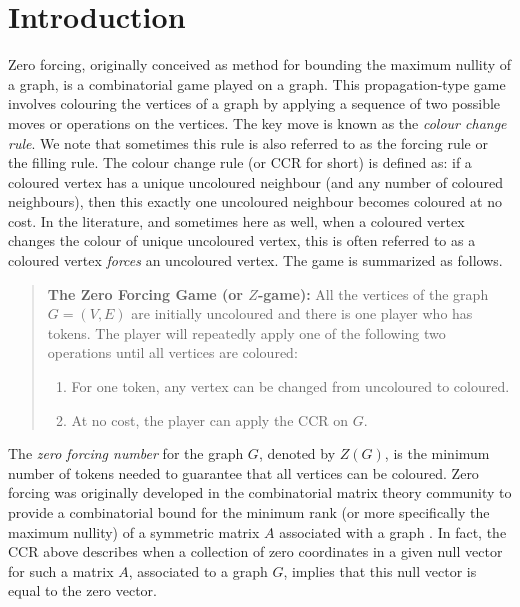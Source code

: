 \documentclass[3p,times,12pt]{article}
\begin{document}
\section{Introduction}


Zero forcing, originally conceived as method for bounding the maximum nullity of a graph, is a combinatorial game played on a graph.  This propagation-type game involves colouring the vertices of a graph by applying a sequence of two possible moves or operations on the vertices. The key move is known as the  \emph{colour change rule}. We note that sometimes this rule is also referred to as the forcing rule or the filling rule. The colour change rule (or CCR for short) is defined as: if a coloured vertex has a unique uncoloured neighbour (and any number of coloured neighbours), then this exactly one uncoloured neighbour becomes coloured at no cost.  In the literature, and sometimes here as well, when a coloured vertex changes the colour of unique uncoloured vertex, this is often referred to as a coloured vertex {\em forces} an uncoloured vertex. The game is summarized as follows.

\begin{quote}
{\bf The Zero Forcing Game (or $Z$-game):} All the vertices of the graph $G=(V,E)$ are initially uncoloured and there is one player who has tokens.  The player will repeatedly apply one of the following two operations until all vertices are coloured:
\begin{enumerate}
\item For one token, any vertex can be changed from uncoloured to coloured.
\item At no cost, the player can apply the CCR on $G$.
\end{enumerate}
\end{quote}

The {\em zero forcing number} for the graph $G$, denoted by $Z(G)$, is the minimum number of tokens needed to guarantee that all vertices can be coloured.  Zero forcing was originally developed in the combinatorial matrix theory community to provide a combinatorial bound for the minimum rank (or more specifically the maximum nullity) of a symmetric matrix $A$ associated with a graph \cite{AIM}.  In fact, the CCR above describes when a collection of zero coordinates in a given null vector for  such a matrix $A$, associated to a graph $G$, implies that this null vector is equal to the zero vector. 
\end{document}
